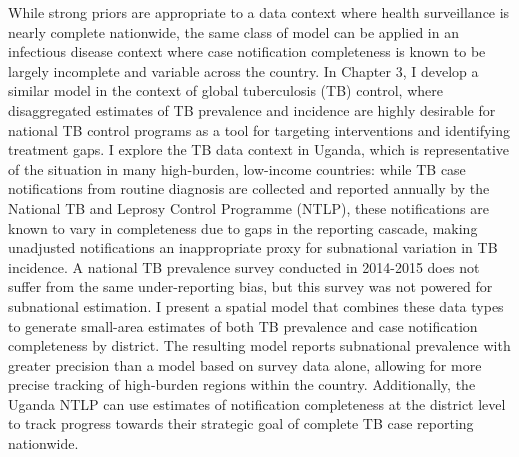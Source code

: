 \documentclass[
]{report}
\begin{document}
While strong priors are appropriate to a data context where health surveillance is nearly complete nationwide, the same class of model can be applied in an infectious disease context where case notification completeness is known to be largely incomplete and variable across the country. In Chapter 3, I develop a similar model in the context of global tuberculosis (TB) control, where disaggregated estimates of TB prevalence and incidence are highly desirable for national TB control programs as a tool for targeting interventions and identifying treatment gaps.\autocite{Glaziou2018a} I explore the TB data context in Uganda, which is representative of the situation in many high-burden, low-income countries: while TB case notifications from routine diagnosis are collected and reported annually by the National TB and Leprosy Control Programme (NTLP), these notifications are known to vary in completeness due to gaps in the reporting cascade, making unadjusted notifications an inappropriate proxy for subnational variation in TB incidence.\autocite{Rood2019,Shaweno2018} A national TB prevalence survey conducted in 2014-2015 does not suffer from the same under-reporting bias, but this survey was not powered for subnational estimation.\autocite{UgandaMinistryofHealth2015} I present a spatial model that combines these data types to generate small-area estimates of both TB prevalence and case notification completeness by district. The resulting model reports subnational prevalence with greater precision than a model based on survey data alone, allowing for more precise tracking of high-burden regions within the country. Additionally, the Uganda NTLP can use estimates of notification completeness at the district level to track progress towards their strategic goal of complete TB case reporting nationwide.\autocite{UgandaNationalTuberculosisandLeprosyProgramme2020a}
\end{document}

